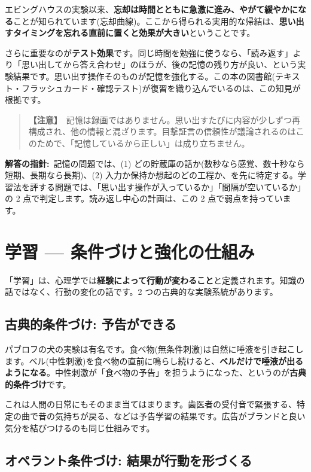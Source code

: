 \documentclass{article}
\begin{document}
エビングハウスの実験以来、\textbf{忘却は時間とともに急激に進み、やがて緩やかになる}ことが知られています(忘却曲線)。ここから得られる実用的な帰結は、\textbf{思い出すタイミングを忘れる直前に置くと効果が大きい}ということです。

さらに重要なのが\textbf{テスト効果}です。同じ時間を勉強に使うなら、「読み返す」より「思い出してから答え合わせ」のほうが、後の記憶の残り方が良い、という実験結果です。思い出す操作そのものが記憶を強化する。この本の図書館(テキスト・フラッシュカード・確認テスト)が復習を織り込んでいるのは、この知見が根拠です。

\begin{quote}
\textbf{【注意】}\ 記憶は録画ではありません。思い出すたびに内容が少しずつ再構成され、他の情報と混ざります。目撃証言の信頼性が議論されるのはこのためで、「記憶しているから正しい」は成り立ちません。
\end{quote}

\textbf{解答の指針:}\ 記憶の問題では、(1) どの貯蔵庫の話か(数秒なら感覚、数十秒なら短期、長期なら長期)、(2) 入力か保持か想起のどの工程か、を先に特定する。学習法を評する問題では、「思い出す操作が入っているか」「間隔が空いているか」の 2 点で判定します。読み返し中心の計画は、この 2 点で弱点を持っています。

\section{学習 — 条件づけと強化の仕組み}

「学習」は、心理学では\textbf{経験によって行動が変わること}と定義されます。知識の話ではなく、行動の変化の話です。2 つの古典的な実験系統があります。

\subsection{古典的条件づけ: 予告ができる}

パブロフの犬の実験は有名です。食べ物(無条件刺激)は自然に唾液を引き起こします。ベル(中性刺激)を食べ物の直前に鳴らし続けると、\textbf{ベルだけで唾液が出るようになる}。中性刺激が「食べ物の予告」を担うようになった、というのが\textbf{古典的条件づけ}です。

これは人間の日常にもそのまま当てはまります。歯医者の受付音で緊張する、特定の曲で昔の気持ちが戻る、などは予告学習の結果です。広告がブランドと良い気分を結びつけるのも同じ仕組みです。

\subsection{オペラント条件づけ: 結果が行動を形づくる}
\end{document}
